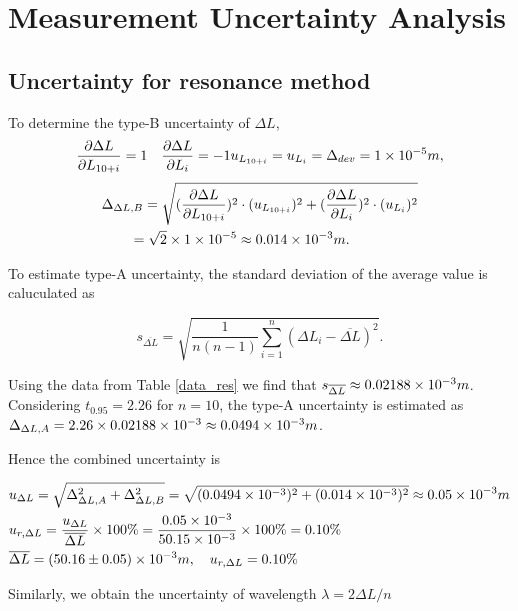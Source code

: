 \section{Measurement Uncertainty Analysis}

\subsection{Uncertainty for resonance method}

    To determine the type-B uncertainty of $\Delta L$,
    $$ \frac{\partial \Delta L}{\partial L_{10+i}}=1 \quad \frac{\partial \Delta
      L}{\partial L_i}=-1 u_{L_{10+i}}=u_{L_i}=\Delta_{dev}=1\times 10^{-5}m,$$ 
    \[
    \begin{split}
        &\Delta_{\Delta L,B}=\sqrt{(\frac{\partial \Delta L}{\partial
            L_{10+i}})^2\cdot (u_{L_{10+i}})^2+(\frac{\partial \Delta
            L}{\partial L_i})^2\cdot (u_{L_i})^2}\\ 
        &\quad\quad =\sqrt{2}\times 1\times 10^{-5}\approx0.014\times 10^{-3}m.\\
    \end{split}
    \]

    To estimate type-A uncertainty, the standard deviation of the average value
    is caluculated as 

    \[
        s_{\overline{\Delta L}}=\sqrt{\frac{1}{n(n-1)}\sum_{i=1}^n(\Delta
          L_i-\overline{\Delta L})^2}. 
    \]

    Using the data from Table \ref{data_res} we find that $s_{\overline{\Delta
        L}}\approx 0.02188\times 10^{-3}m$. Considering $t_{0.95}=2.26$ for $n=10$, the
    type-A uncertainty is estimated as $\Delta_{\Delta
      L,A}=2.26\times0.02188\times 10^{-3}\approx 0.0494\times 10^{-3}m$. 

    Hence the combined uncertainty is 

    \[
    \begin{split}
        &u_{\Delta L}=\sqrt{\Delta_{\Delta L,A}^2+\Delta_{\Delta
            L,B}^2}=\sqrt{(0.0494\times 10^{-3})^2+(0.014\times 10^{-3})^2}\approx0.05\times 10^{-3}m\\ 
        &u_{r,\Delta L}=\frac{u_{\Delta L}}{\overline{\Delta L}}\times
        100\%=\frac{0.05\times 10^{-3}}{50.15\times 10^{-3}}\times100\%=0.10\%\\ 
        &\overline{\Delta L}=(50.16\pm 0.05)\times 10^{-3}m,\quad u_{r,\Delta L}=0.10\% 
    \end{split}
    \]

    Similarly, we obtain the uncertainty of wavelength $\lambda=2\Delta L/n$

